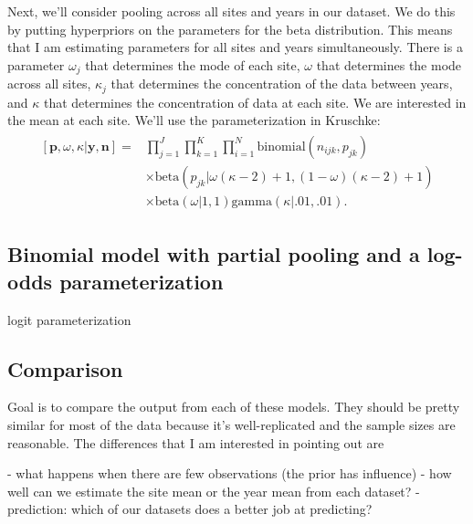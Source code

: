 \documentclass[12pt, oneside, titlepage]{article}   	%
\begin{document}
Next, we'll consider pooling across all sites and years in our dataset. We do this by putting hyperpriors on the parameters for the beta distribution. This means that I am estimating parameters for all sites and years simultaneously. There is a parameter $\omega_j$ that determines the mode of each site, $\omega$ that determines the mode across all sites, $\kappa_j$ that determines the concentration of the data between years, and $\kappa$ that determines the concentration of data at each site. We are interested in the mean at each site. We'll use the parameterization in Kruschke:
%
\begin{align}
  \begin{split}
[\bm{p},\omega,\kappa|\bm{y},\bm{n}]  = & \prod_{j=1}^J \prod_{k=1}^K \prod_{i=1}^N \mathrm{binomial}(n_{ijk},p_{jk}) 
    \\ & \times \mathrm{beta} (  p_{jk} | \omega(\kappa-2) +1 , (1-\omega) (\kappa -2) + 1) 
    \\ & \times \mathrm{beta} ( \omega | 1, 1) \mathrm{gamma} ( \kappa | .01, .01)  .
  \end{split}
\end{align}



\subsection*{Binomial model with partial pooling and a log-odds parameterization}

logit parameterization 

\subsection*{Comparison}

Goal is to compare the output from each of these models. They should be pretty similar for most of the data because it's well-replicated and the sample sizes are reasonable. The differences that I am interested in pointing out are

- what happens when there are few observations (the prior has influence)
- how well can we estimate the site mean or the year mean from each dataset?
- prediction: which of our datasets does a better job at predicting?

\clearpage

\end{document}
